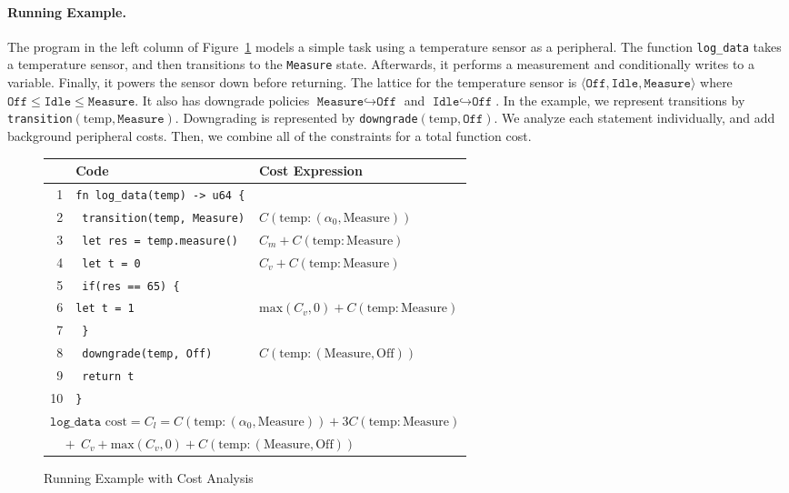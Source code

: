 \documentclass[sigconf, nonacm, screen]{acmart}
\begin{document}
\paragraph{Running Example.}
The program in the left column of Figure~\ref{fig:cost_analysis_example} models a simple task using a temperature sensor as a peripheral. The function \texttt{log\_data} takes a temperature sensor, and then transitions to the \texttt{Measure} state. Afterwards, it performs a measurement and conditionally writes to a variable. Finally, it powers the sensor down before returning. The lattice for the temperature sensor is $\langle \texttt{Off}, \texttt{Idle}, \texttt{Measure} \rangle$ where $\texttt{Off} \leq \texttt{Idle} \leq \texttt{Measure}$. It also has downgrade policies $\texttt{Measure} \hookrightarrow \texttt{Off}$ and $\texttt{Idle} \hookrightarrow \texttt{Off}$. In the example, we represent transitions by \texttt{transition}$(\text{temp}, \texttt{Measure})$. Downgrading is represented  by \texttt{downgrade}$(\text{temp}, \texttt{Off})$. We analyze each statement individually, and add background peripheral costs. Then, we combine all of the constraints for a total function cost.
\begin{figure}
\centering
\small
\setlength{\tabcolsep}{3pt}
\begin{tabular}{|r|p{4cm}|l|}
\hline
\textbf{} & \textbf{Code} & \textbf{Cost Expression} \\
\hline
1 & \texttt{fn log\_data(temp) -> u64 \{} & \\
2 & \ \texttt{transition(temp, Measure)} & $C(\text{temp}: (\alpha_0, \text{Measure}))$ \\
3 & \ \texttt{let res = temp.measure()} & $C_m + C(\text{temp}: \text{Measure})$ \\
4 & \ \texttt{let t = 0} & $C_v + C(\text{temp}: \text{Measure})$ \\
5 & \ \texttt{if(res == 65) \{} & \\
6 & \quad \texttt{let t = 1} & $\text{max}(C_v, 0) + C(\text{temp}: \text{Measure})$ \\
7 & \ \texttt{\}} & \\
8 & \ \texttt{downgrade(temp, Off)} & $C(\text{temp}: (\text{Measure},\text{Off}))$ \\
9 & \ \texttt{return t} & \\
10 & \texttt{\}} & \\
\hline
\multicolumn{3}{|l|}{$\texttt{log\_data} \text{ cost} = C_l = C(\text{temp}: (\alpha_0, \text{Measure})) + 3C(\text{temp}: \text{Measure})$} \\
\multicolumn{3}{|l|}{$\phantom{C_l} + \ C_v + \text{max}(C_v, 0) + C(\text{temp}: (\text{Measure}, \text{Off}))$} \\
\hline
\end{tabular}
\caption{Running Example with Cost Analysis}
\label{fig:cost_analysis_example}
\end{figure}
\end{document}
